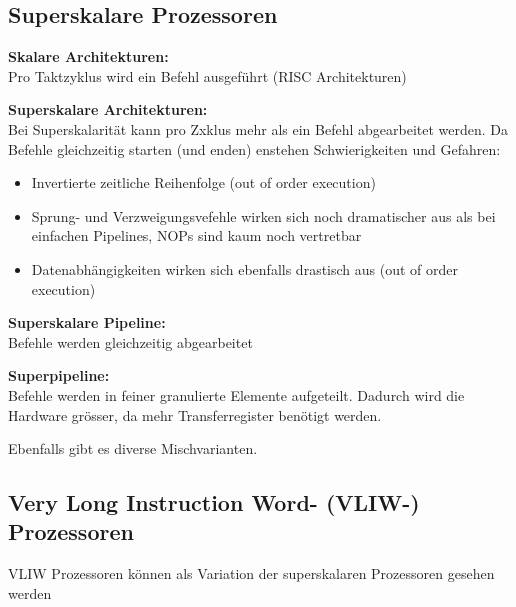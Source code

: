 \subsection{Superskalare Prozessoren}
\textbf{Skalare Architekturen:}\\
Pro Taktzyklus wird ein Befehl ausgeführt (RISC Architekturen)

\textbf{Superskalare Architekturen:}\\
Bei Superskalarität kann pro Zxklus mehr als ein Befehl abgearbeitet werden.
Da Befehle gleichzeitig starten (und enden) enstehen Schwierigkeiten und Gefahren:
\begin{itemize}[noitemsep,topsep=0pt]
	\item Invertierte zeitliche Reihenfolge (out of order execution)
	\item Sprung- und Verzweigungsvefehle wirken sich noch dramatischer aus als bei einfachen Pipelines, NOPs sind kaum noch vertretbar
	\item Datenabhängigkeiten wirken sich ebenfalls drastisch aus (out of order execution)
			
\end{itemize}

\textbf{Superskalare Pipeline:}\\
Befehle werden gleichzeitig abgearbeitet

\textbf{Superpipeline:}\\
Befehle werden in feiner granulierte Elemente aufgeteilt. Dadurch wird die Hardware grösser, da mehr Transferregister benötigt werden.\newline

Ebenfalls gibt es diverse Mischvarianten.

\subsection{Very Long Instruction Word- (VLIW-) Prozessoren}
VLIW Prozessoren können als Variation der superskalaren Prozessoren gesehen werden

